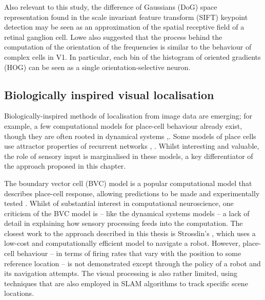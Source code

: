 Also relevant to this study, the difference of Gaussians (DoG) space representation found in the scale invariant feature transform (SIFT) keypoint detection \cite{lowe2004distinctive} may be seen as an approximation of the spatial receptive field of a retinal ganglion cell. Lowe also suggested that the process behind the computation of the orientation of the frequencies is similar to the behaviour of complex cells in V1. In particular, each bin of the histogram of oriented gradients (HOG) can be seen as a single orientation-selective neuron.



\subsection{Biologically inspired visual localisation}

Biologically-inspired methods of localisation from image data are emerging; for example, a few computational models for place-cell behaviour already exist, though they are often rooted in dynamical systems \cite{blair2008conversion},\cite{bechtel2013investigating}. Some models of place cells use attractor properties of recurrent networks \cite{stringer2002self}, \cite{moser2008place}.  Whilst interesting and valuable, the role of sensory input is marginalised in these models, a key differentiator of the approach proposed in this chapter.

The boundary vector cell (BVC) model \cite{barry2006boundary} is a popular computational model that describes place-cell response, allowing predictions to be made and experimentally tested \cite{burgess2000predictions}. Whilst of substantial interest in computational neuroscience, one criticism of the BVC model is -- like the dynamical systems models -- a lack of detail in explaining how sensory processing feeds into the computation. The closest work to the approach described in this thesis is Strosslin's \cite{strosslin2005robust}, which uses a low-cost and computationally efficient model to navigate a robot.  However, place-cell behaviour -- in terms of firing rates that vary with the position to some reference location -- is not demonstrated except through the policy of a robot and its navigation attempts.  The visual processing is also rather limited, using techniques that are also employed in SLAM algorithms \cite{alcantarilla2010visual} to track specific scene locations. 


